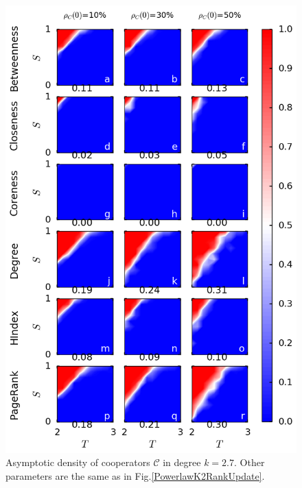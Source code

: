 \documentclass[preprint,12pt,3p]{elsarticle}
\begin{document}
\begin{figure}[htbp]
\centering
\includegraphics[width=13cm]{PowerlawK2.7RankUpdate.png}
\caption{Asymptotic density of cooperators $\mathcal{C}$ in degree $k=2.7$.
Other parameters are the same as in Fig.\ref{PowerlawK2RankUpdate}.}
\label{PowerlawK2.7RankUpdate}
\end{figure}
\end{document}
